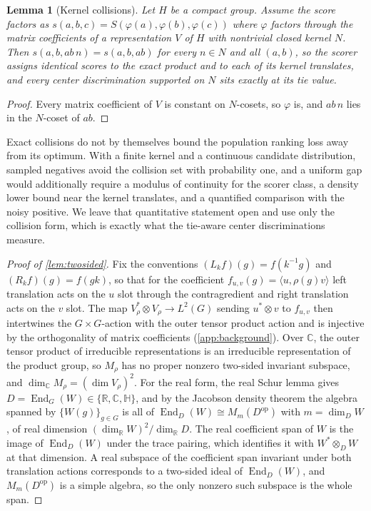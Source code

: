 \documentclass{article}
\newtheorem{lemma}{Lemma}
\DeclareMathOperator{\End}{End}
\newcommand{\R}{\mathbb{R}}
\newcommand{\C}{\mathbb{C}}
\newcommand{\HH}{\mathbb{H}}
\begin{document}
\begin{lemma}[Kernel collisions]
\label{lem:necessity}
Let $H$ be a compact group. Assume the score factors as
$s(a,b,c) = S(\varphi(a), \varphi(b), \varphi(c))$ where $\varphi$
factors through the matrix coefficients of a representation $V$ of $H$
with nontrivial closed kernel $N$. Then
$s(a, b, ab\,n) = s(a, b, ab)$ for every $n \in N$ and all $(a, b)$,
so the scorer assigns identical scores to the exact product and to
each of its kernel translates, and every center discrimination
supported on $N$ sits exactly at its tie value.
\end{lemma}

\begin{proof}
Every matrix coefficient of $V$ is constant on $N$-cosets, so
$\varphi$ is, and $ab\,n$ lies in the $N$-coset of $ab$.
\end{proof}

Exact collisions do not by themselves bound the population ranking loss
away from its optimum. With a finite kernel and a continuous candidate
distribution, sampled negatives avoid the collision set with probability
one, and a uniform gap would additionally require a modulus of
continuity for the scorer class, a density lower bound near the kernel
translates, and a quantified comparison with the noisy positive. We
leave that quantitative statement open and use only the collision form,
which is exactly what the tie-aware center discriminations measure.

\begin{proof}[Proof of \cref{lem:twosided}]
Fix the conventions $(L_k f)(g) = f(k^{-1} g)$ and
$(R_k f)(g) = f(g k)$, so that for the coefficient
$f_{u,v}(g) = \langle u, \rho(g) v\rangle$ left translation acts on
the $u$ slot through the contragredient and right translation acts on
the $v$ slot. The map $V_\rho^* \otimes V_\rho \to L^2(G)$ sending
$u^* \otimes v$ to $f_{u,v}$ then intertwines the
$G \times G$-action with the outer tensor product action and is
injective by the orthogonality of matrix coefficients
(\cref{app:background}). Over $\C$, the outer tensor product of
irreducible representations is an irreducible representation of the
product group, so $M_\rho$ has no proper nonzero two-sided invariant
subspace, and $\dim_\C M_\rho = (\dim V_\rho)^2$. For the real form,
the real Schur lemma gives $D = \End_G(W) \in \{\R, \C, \HH\}$, and
by the Jacobson density theorem the algebra spanned by
$\{W(g)\}_{g \in G}$ is all of $\End_D(W) \cong M_m(D^{\mathrm{op}})$
with $m = \dim_D W$, of real dimension
$(\dim_\R W)^2/\dim_\R D$. The real coefficient span of $W$ is the
image of $\End_D(W)$ under the trace pairing, which identifies it
with $W^* \otimes_D W$ at that dimension. A real subspace of the
coefficient span invariant under both translation actions corresponds
to a two-sided ideal of $\End_D(W)$, and $M_m(D^{\mathrm{op}})$ is a
simple algebra, so the only nonzero such subspace is the whole span.
\end{proof}
\end{document}
